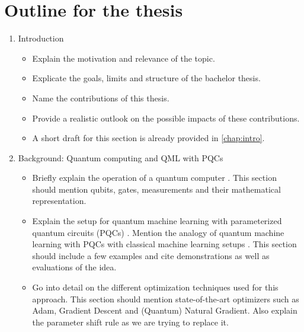 \chapter{Outline for the thesis}
\label{chap:outline}

\begin{enumerate}
    \item Introduction
    \begin{itemize}
        \item
            Explain the motivation and relevance of the topic.
        \item
            Explicate the goals, limits and structure of the bachelor thesis.
        \item
            Name the contributions of this thesis.
        \item
            Provide a realistic outlook on the possible impacts of these
            contributions.
        \item
            A short draft for this section is already provided in
            \autoref{chap:intro}.
    \end{itemize}

    \item Background: Quantum computing and QML with PQCs
    \begin{itemize}
        \item
            Briefly explain the operation of a quantum computer
            \cite{nielsen_quantum_2007}.
            This section should mention qubits, gates, measurements and their
            mathematical representation.
        \item
            Explain the setup for quantum machine learning with parameterized
            quantum circuits (PQCs) \cite{mitarai_quantum_2018}.
            Mention the analogy of quantum machine learning with PQCs with
            classical machine learning setups \cite{bishop_pattern_2006}.
            This section should include a few examples and cite demonstrations
            as well as evaluations of the idea.
        \item
            Go into detail on the different optimization techniques used for
            this approach.
            This section should mention state-of-the-art optimizers such as
            Adam, Gradient Descent and (Quantum) Natural Gradient.
            Also explain the parameter shift rule
            \cite{mitarai_quantum_2018,schuld_evaluating_2019} as we are trying
            to replace it.
    \end{itemize}


\end{enumerate}
